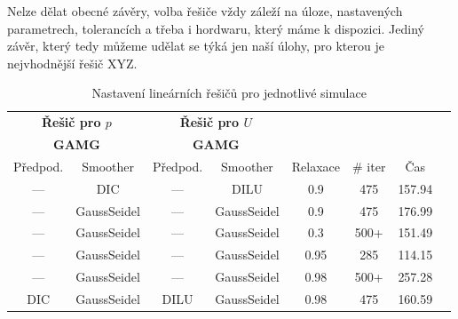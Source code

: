 \documentclass[a4paper,12pt]{report}
\theoremstyle{remark}
\begin{document}
Nelze dělat obecné závěry, volba řešiče vždy záleží na úloze, nastavených parametrech, tolerancích a třeba i hordwaru, který máme k dispozici. Jediný závěr, který tedy můžeme udělat se týká jen naší úlohy, pro kterou je nejvhodnější řešič XYZ.


 \begin{table}[H]
	\centering
	\caption{Nastavení lineárních řešičů pro jednotlivé simulace}
	\renewcommand{\arraystretch}{1.9}
	\begin{tabular}{*8c}
		\toprule
		\multicolumn{2}{c}{\textbf{Řešič pro $p$}} & \multicolumn{2}{c}{\textbf{Řešič pro $U$}}\\
		\multicolumn{2}{c}{\textbf{GAMG}} & \multicolumn{2}{c}{\textbf{GAMG}}\\		
		\midrule
		Předpod.&Smoother&Předpod.&Smoother&Relaxace& \# iter&Čas\\
		
		\midrule
		
		--- & DIC & --- &  DILU & 0.9&475 &157.94\\
		
		--- & GaussSeidel &  --- & GaussSeidel & 0.9&475&176.99\\
		
		--- & GaussSeidel &  --- & GaussSeidel & 0.3&500+&151.49\\
		
		--- & GaussSeidel &  --- & GaussSeidel & 0.95&285&114.15\\
		
		--- & GaussSeidel &  --- & GaussSeidel & 0.98&500+&257.28\\
		
		DIC & GaussSeidel &  DILU & GaussSeidel & 0.98&475&160.59\\
		\bottomrule
	\end{tabular}
	
	\label{table:solvers_set1}
	
\end{table}
\end{document}
